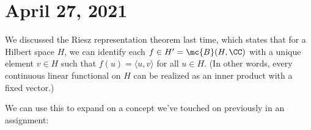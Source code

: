 
\pagebreak\section*{April 27, 2021}

We discussed the Riesz representation theorem last time, which states that for a Hilbert space $H$, we can identify each $f \in H' = \mc{B}(H, \CC)$ with a unique element $v \in H$ such that $f(u) = \langle u, v \rangle$ for all $u \in H$. (In other words, every continuous linear functional on $H$ can be realized as an inner product with a fixed vector.) 

We can use this to expand on a concept we've touched on previously in an assignment:

